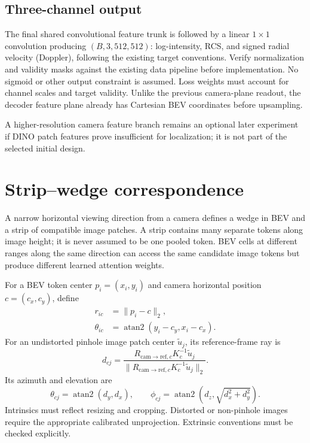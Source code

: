 \documentclass[11pt,a4paper]{article}
\begin{document}
\subsection{Three-channel output}
The final shared convolutional feature trunk is followed by a linear $1\times1$ convolution producing $(B,3,512,512)$: log-intensity, RCS, and signed radial velocity (Doppler), following the existing target conventions. Verify normalization and validity masks against the existing data pipeline before implementation. No sigmoid or other output constraint is assumed. Loss weights must account for channel scales and target validity. Unlike the previous camera-plane readout, the decoder feature plane already has Cartesian BEV coordinates before upsampling.

A higher-resolution camera feature branch remains an optional later experiment if DINO patch features prove insufficient for localization; it is not part of the selected initial design.

\section{Strip--wedge correspondence}
A narrow horizontal viewing direction from a camera defines a wedge in BEV and a strip of compatible image patches. A strip contains many separate tokens along image height; it is never assumed to be one pooled token. BEV cells at different ranges along the same direction can access the same candidate image tokens but produce different learned attention weights.

For a BEV token center $p_i=(x_i,y_i)$ and camera horizontal position $c=(c_x,c_y)$, define
\begin{align}
 r_{ic} &= \lVert p_i-c\rVert_2,\\
 \theta_{ic} &= \operatorname{atan2}(y_i-c_y,x_i-c_x).
\end{align}
For an undistorted pinhole image patch center $\widetilde u_j$, its reference-frame ray is
\begin{equation}
 d_{cj}=\frac{R_{\mathrm{cam}\to\mathrm{ref},c}K_c^{-1}\widetilde u_j}
 {\lVert R_{\mathrm{cam}\to\mathrm{ref},c}K_c^{-1}\widetilde u_j\rVert_2}.
\end{equation}
Its azimuth and elevation are
\begin{equation}
 \theta_{cj}=\operatorname{atan2}(d_y,d_x),\qquad
 \phi_{cj}=\operatorname{atan2}\left(d_z,\sqrt{d_x^2+d_y^2}\right).
\end{equation}
Intrinsics must reflect resizing and cropping. Distorted or non-pinhole images require the appropriate calibrated unprojection. Extrinsic conventions must be checked explicitly.
\end{document}
